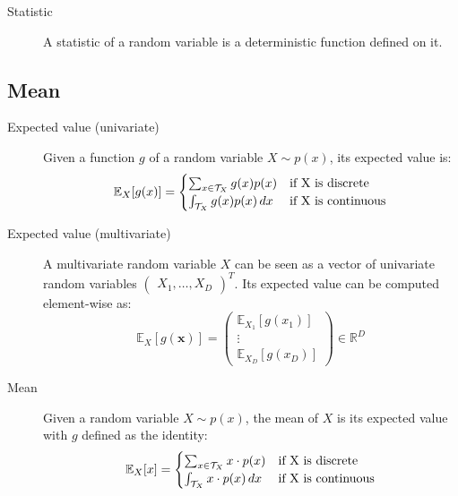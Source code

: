\begin{description}
    \item[Statistic] 
        A statistic of a random variable is a deterministic function defined on it. 
\end{description}


\subsection{Mean}
\begin{description}
    \item[Expected value (univariate)] 
        Given a function $g$ of a random variable $X \sim p(x)$,
        its expected value is:
        \[ 
            \mathbb{E}_X[g(x)] = 
            \begin{cases}
                \sum_{x \in \mathcal{T}_X} g(x)p(x) & \text{if } $X$ \text{ is discrete} \\
                \int_{\mathcal{T}_X} g(x)p(x) \,dx  & \text{if } $X$ \text{ is continuous} \\
            \end{cases}
        \]

    \item[Expected value (multivariate)] 
        A multivariate random variable $X$ can be seen as 
        a vector of univariate random variables $\begin{pmatrix} X_1, \dots, X_D \end{pmatrix}^T$.
        Its expected value can be computed element-wise as:
        \[ 
            \mathbb{E}_X[g(\bm{x})] = 
            \begin{pmatrix} \mathbb{E}_{X_1}[g(x_1)] \\ \vdots \\ \mathbb{E}_{X_D}[g(x_D)] \end{pmatrix} \in \mathbb{R}^D
        \]

    \item[Mean] 
        Given a random variable $X \sim p(x)$,
        the mean of $X$ is its expected value with $g$ defined as the identity:
        \[ 
            \mathbb{E}_X[x] = 
            \begin{cases}
                \sum_{x \in \mathcal{T}_X} x \cdot p(x) & \text{if } $X$ \text{ is discrete} \\
                \int_{\mathcal{T}_X} x \cdot p(x) \,dx  & \text{if } $X$ \text{ is continuous} \\
            \end{cases}
        \]
\end{description}


